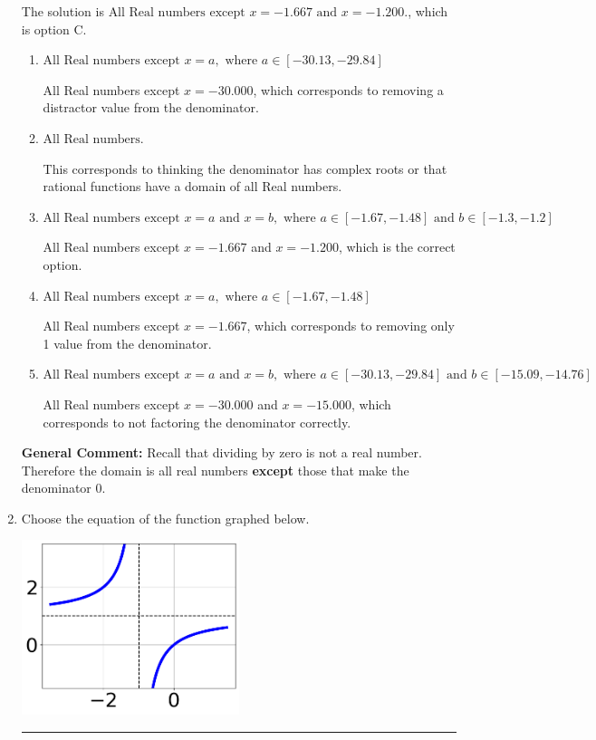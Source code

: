 \documentclass{extbook}[14pt]
\newcommand{\litem}[1]{\item #1

\rule{\textwidth}{0.4pt}}
\begin{document}
\begin{enumerate}
{The solution is \( \text{All Real numbers except } x = -1.667 \text{ and } x = -1.200. \), which is option C.\begin{enumerate}[label=\Alph*.]
\item \( \text{All Real numbers except } x = a, \text{ where } a \in [-30.13, -29.84] \)

All Real numbers except $x = -30.000$, which corresponds to removing a distractor value from the denominator.
\item \( \text{All Real numbers.} \)

This corresponds to thinking the denominator has complex roots or that rational functions have a domain of all Real numbers.
\item \( \text{All Real numbers except } x = a \text{ and } x = b, \text{ where } a \in [-1.67, -1.48] \text{ and } b \in [-1.3, -1.2] \)

All Real numbers except $x = -1.667$ and $x = -1.200$, which is the correct option.
\item \( \text{All Real numbers except } x = a, \text{ where } a \in [-1.67, -1.48] \)

All Real numbers except $x = -1.667$, which corresponds to removing only 1 value from the denominator.
\item \( \text{All Real numbers except } x = a \text{ and } x = b, \text{ where } a \in [-30.13, -29.84] \text{ and } b \in [-15.09, -14.76] \)

All Real numbers except $x = -30.000$ and $x = -15.000$, which corresponds to not factoring the denominator correctly.
\end{enumerate}

\textbf{General Comment:} Recall that dividing by zero is not a real number. Therefore the domain is all real numbers \textbf{except} those that make the denominator 0.
}
\litem{
Choose the equation of the function graphed below.

\begin{center}
    \includegraphics[width=0.5\textwidth]{../Figures/rationalGraphToEquationC.png}
\end{center}




}
\end{enumerate}
\end{document}

